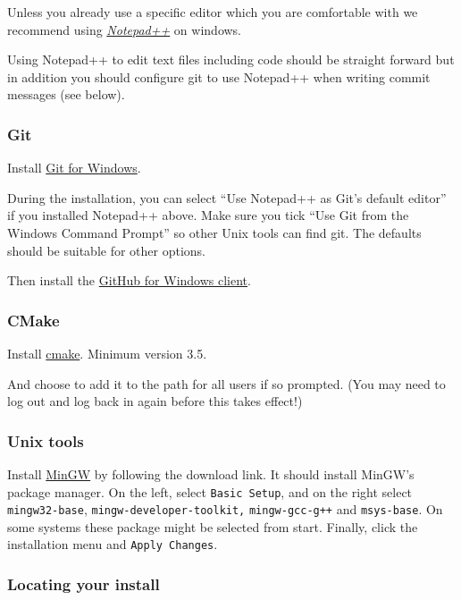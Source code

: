 Unless you already use a specific editor which you are comfortable with
we recommend using
\href{http://notepad-plus-plus.org/}{\emph{Notepad++}} on windows.

Using Notepad++ to edit text files including code should be straight
forward but in addition you should configure git to use Notepad++ when
writing commit messages (see below).

\subsubsection{Git}\label{git-2}

Install \href{http://gitforwindows.org/}{Git for Windows}.

During the installation, you can select ``Use Notepad++ as Git's default
editor'' if you installed Notepad++ above. Make sure you tick ``Use Git
from the Windows Command Prompt'' so other Unix tools can find git. The
defaults should be suitable for other options.

Then install the \href{http://windows.github.com/}{GitHub for Windows
client}.

\subsubsection{CMake}\label{cmake-2}

Install
\href{http://www.cmake.org/cmake/resources/software.html}{cmake}.
Minimum version 3.5.

And choose to add it to the path for all users if so prompted. (You may
need to log out and log back in again before this takes effect!)

\subsubsection{Unix tools}\label{unix-tools}

Install \href{http://sourceforge.net/projects/mingw/}{MinGW} by
following the download link. It should install MinGW's package manager.
On the left, select \texttt{Basic Setup}, and on the right select
\texttt{mingw32-base}, \texttt{mingw-developer-toolkit,}
\texttt{mingw-gcc-g++} and \texttt{msys-base}. On some systems these
package might be selected from start. Finally, click the installation
menu and \texttt{Apply Changes}.

\subsubsection{Locating your install}\label{locating-your-install}

